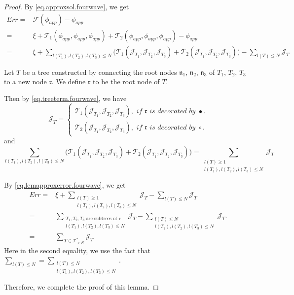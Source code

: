 \begin{proof} By \eqref{eq.approxsol.fourwave}, we get
\begin{equation}\label{eq.lemapproxerror.fourwave}
\begin{split}
 Err=&\mathcal{F}(\phi_{app})-\phi_{app} 
 \\
 =&\xi+\mathcal{T}_1(\phi_{app},\phi_{app},\phi_{app})+\mathcal{T}_2(\phi_{app},\phi_{app},\phi_{app})-\phi_{app}
 \\
 =&\xi+\sum_{l(T_1),l(T_2),l(T_3)\le N} \Big(\mathcal{T}_1(\mathcal{J}_{T_1},\mathcal{J}_{T_2},\mathcal{J}_{T_3})+\mathcal{T}_2(\mathcal{J}_{T_1},\mathcal{J}_{T_2},\mathcal{J}_{T_3})\Big)-\sum_{l(T)\le N} \mathcal{J}_T
\end{split}
\end{equation}

Let $T$ be a tree constructed by connecting the root nodes $\mathfrak{n}_1$, $\mathfrak{n}_2$, $\mathfrak{n}_3$ of $T_1$, $T_2$, $T_3$ to a new node $\mathfrak{r}$. We define $\mathfrak{r}$ to be the root node of $T$.

Then by \eqref{eq.treeterm.fourwave}, we have
\begin{equation}
 \mathcal{J}_T=
 \begin{cases}
 \mathcal{T}_1(\mathcal{J}_{T_1}, \mathcal{J}_{T_2}, \mathcal{J}_{T_3}), \textit{ if }\mathfrak{r}\textit{ is decorated by }\bullet.
 \\
 \mathcal{T}_2(\mathcal{J}_{T_1}, \mathcal{J}_{T_2}, \mathcal{J}_{T_3}), \textit{ if }\mathfrak{r}\textit{ is decorated by }\circ.
 \end{cases}
\end{equation}
and 
\begin{equation}
 \sum_{l(T_1),l(T_2),l(T_3)\le N} \Big(\mathcal{T}_1(\mathcal{J}_{T_1},\mathcal{J}_{T_2},\mathcal{J}_{T_3})+\mathcal{T}_2(\mathcal{J}_{T_1},\mathcal{J}_{T_2},\mathcal{J}_{T_3})\Big)=\sum_{\substack{l(T)\ge 1\\ l(T_1),l(T_2),l(T_3)\le N}} \mathcal{J}_{T}
\end{equation}

By \eqref{eq.lemapproxerror.fourwave}, we get
\begin{equation}
\begin{split}
 Err=&\xi+\sum_{\substack{l(T)\ge 1\\ l(T_1),l(T_2),l(T_3)\le N}} \mathcal{J}_{T}-\sum_{l(T)\le N} \mathcal{J}_T
 \\
 =&\sum_{\substack{T_1,T_2,T_3\text{ are subtrees of }\mathfrak{r}\\ l(T_1),l(T_2),l(T_3)\le N}} \mathcal{J}_{T}-\sum_{\substack{l(T)\le N\\ l(T_1),l(T_2),l(T_3)\le N}} \mathcal{J}_T.
 \\
 =&\sum_{T\in \mathcal{T}_{>N}^*} \mathcal{J}_T
\end{split}
\end{equation}
Here in the second equality, we use the fact that $\sum_{l(T)\le N}=\sum_{\substack{l(T)\le N\\ l(T_1),l(T_2),l(T_3)\le N}}$.

Therefore, we complete the proof of this lemma.
\end{proof}
